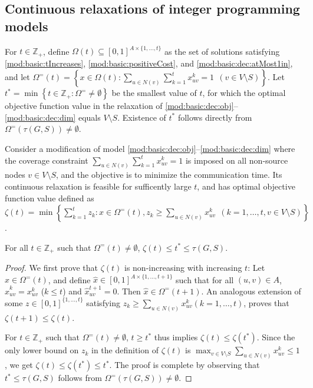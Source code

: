 \subsection{Continuous relaxations of integer programming models} \label{sec:lblprel}

For $t\in\mathbb{Z}_+$, define $\Omega(t)\subseteq[0,1]^{A\times\{1,\ldots,t\}}$ as the set of solutions satisfying
\eqref{mod:basic:tIncreases}, \eqref{mod:basic:positiveCost}, and \eqref{mod:basic:dec:atMost1in},
and let $\Omega^=(t) = \left\{x\in\Omega(t): \sum\limits_{u \in N(v)} \sum\limits_{k=1}^tx_{uv}^k = 1 ~~(v\in V\setminus S)\right\}$.
Let $t^{\ast}=\min\left\{t\in\mathbb{Z}_+: \Omega^=\neq\emptyset\right\}$ be the smallest value of $t$, for which the optimal objective function value in
the relaxation of \eqref{mod:basic:dec:obj}--\eqref{mod:basic:dec:dim} equals $V\setminus S$.
Existence of $t^{\ast}$ follows directly from $\Omega^=\left(\tau(G,S)\right)\neq\emptyset$.

Consider a modification of model \eqref{mod:basic:dec:obj}--\eqref{mod:basic:dec:dim} where the coverage constraint
$\sum\limits_{u \in N(v)} \sum\limits_{k=1}^tx_{uv}^k = 1$ is imposed on all non-source nodes $v\in V\setminus S$, and the objective is to minimize the communication time.
Its continuous relaxation is feasible for sufficently large $t$, and has optimal objective function value defined as
$\zeta(t)=\min\left\{\sum\limits_{k=1}^tz_k: x\in\Omega^=(t), z_k\geq\sum\limits_{u \in N(v)}x_{uv}^k ~~(k=1,\ldots,t, v\in V\setminus S)\right\}$.

\begin{proposition} \label{prop:lpweak}
For all $t\in\mathbb{Z}_+$ such that $\Omega^=(t)\neq\emptyset$, $\zeta(t)\leq t^{\ast}\leq\tau(G,S)$.
\end{proposition}
\begin{proof}
We first prove that $\zeta(t)$ is non-increasing with increasing $t$: Let $x\in\Omega^=(t)$, and define $\hat{x}\in[0,1]^{A\times\{1,\ldots,t+1\}}$ such that
for all $(u,v)\in A$, $\hat{x}_{uv}^k=x_{uv}^k$ ($k\leq t$) and $\hat{x}_{uv}^{t+1}=0$.
Then $\hat{x}\in\Omega^=(t+1)$.
An analogous extension of some $z\in[0,1]^{\{1,\ldots,t\}}$ satisfying $z_k\geq\sum\limits_{u \in N(v)}x_{uv}^k (k=1,\ldots,t)$, proves that $\zeta(t+1)\leq\zeta(t)$.

For $t\in\mathbb{Z}_+$ such that $\Omega^=(t)\neq\emptyset$, $t\geq t^{\ast}$ thus implies $\zeta(t)\leq\zeta(t^{\ast})$.
Since the only lower bound on $z_k$ in the definition of $\zeta(t)$ is $\max_{v\in V\setminus S}\sum\limits_{u \in N(v)}x_{uv}^k\leq 1$,
we get $\zeta(t)\leq\zeta(t^{\ast})\leq t^{\ast}$.
The proof is complete by observing that $t^{\ast}\leq\tau(G,S)$ follows from $\Omega^=\left(\tau(G,S)\right)\neq\emptyset$.
\end{proof}

